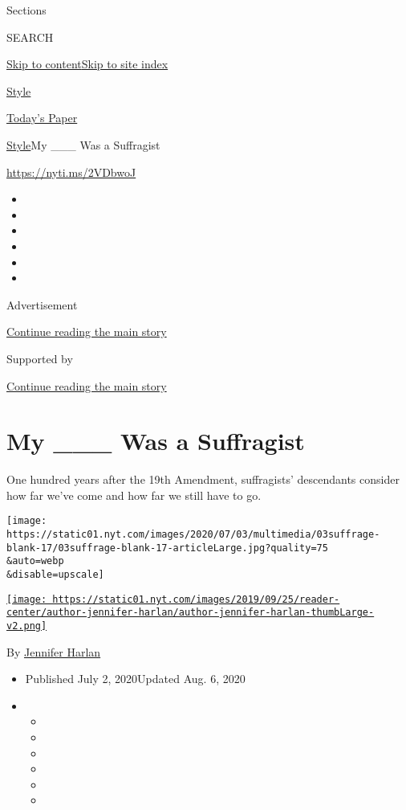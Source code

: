 Sections

SEARCH

\protect\hyperlink{site-content}{Skip to
content}\protect\hyperlink{site-index}{Skip to site index}

\href{https://www.nytimes.com/section/style}{Style}

\href{https://myaccount.nytimes.com/auth/login?response_type=cookie\&client_id=vi}{}

\href{https://www.nytimes.com/section/todayspaper}{Today's Paper}

\href{/section/style}{Style}\textbar{}My \_\_\_ Was a Suffragist

\href{https://nyti.ms/2VDbwoJ}{https://nyti.ms/2VDbwoJ}

\begin{itemize}
\item
\item
\item
\item
\item
\item
\end{itemize}

Advertisement

\protect\hyperlink{after-top}{Continue reading the main story}

Supported by

\protect\hyperlink{after-sponsor}{Continue reading the main story}

\hypertarget{my-___-was-a-suffragist}{%
\section{My \_\_\_ Was a Suffragist}\label{my-___-was-a-suffragist}}

One hundred years after the 19th Amendment, suffragists' descendants
consider how far we've come and how far we still have to go.

\texttt{[image: https://static01.nyt.com/images/2020/07/03/multimedia/03suffrage-blank-17/03suffrage-blank-17-articleLarge.jpg?quality=75\\\&auto=webp\\\&disable=upscale]}

\href{https://www.nytimes.com/by/jennifer-harlan}{\texttt{[image: https://static01.nyt.com/images/2019/09/25/reader-center/author-jennifer-harlan/author-jennifer-harlan-thumbLarge-v2.png]}}

By \href{https://www.nytimes.com/by/jennifer-harlan}{Jennifer Harlan}

\begin{itemize}
\item
  Published July 2, 2020Updated Aug. 6, 2020
\item
  \begin{itemize}
  \item
  \item
  \item
  \item
  \item
  \item
  \end{itemize}
\end{itemize}

